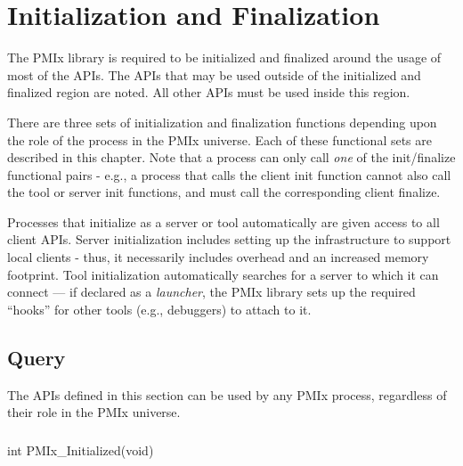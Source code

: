 \chapter{Initialization and Finalization}
\label{chap:api_init}

The \ac{PMIx} library is required to be initialized and finalized around the usage of most of the \acp{API}.
The \acp{API} that may be used outside of the initialized and finalized region are noted.
All other \acp{API} must be used inside this region.

There are three sets of initialization and finalization functions depending upon the role of the process in the \ac{PMIx} universe.
Each of these functional sets are described in this chapter. Note that a process can only call \textit{one} of the
init/finalize functional pairs - e.g., a process that calls the client init function cannot also call the tool or server
init functions, and must call the corresponding client finalize.

\adviceuserstart
Processes that initialize as a server or tool automatically are given access to all client \acp{API}. Server initialization
includes setting up the infrastructure to support local clients - thus, it necessarily includes overhead and an increased
memory footprint. Tool initialization automatically searches for a server to which it can connect --- if declared as a
\textit{launcher}, the \ac{PMIx} library sets up the required ``hooks'' for other tools (e.g., debuggers) to attach to it.
\adviceuserend


\section{Query}
\label{chap:api_init:general}

The APIs defined in this section can be used by any PMIx process, regardless of their role in the PMIx universe.

\subsection{}

\format

\cspecificstart
\begin{codepar}
int PMIx_Initialized(void)
\end{codepar}
\cspecificend

